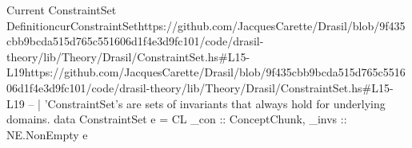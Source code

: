 \begin{haskell}{Current ConstraintSet Definition}{curConstraintSet}{https://github.com/JacquesCarette/Drasil/blob/9f435cbb9bcda515d765c551606d1f4e3d9fc\newline{}101/code/drasil-theory/lib/Theory/Drasil/ConstraintSet.hs\#L15-L19}{https://github.com/JacquesCarette/Drasil/blob/9f435cbb9bcda515d765c551606d1f4e3d9fc101/code/drasil-theory/lib/Theory/Drasil/ConstraintSet.hs\#L15-L19}
-- | 'ConstraintSet's are sets of invariants that always hold for underlying domains.
data ConstraintSet e = CL {
    _con  :: ConceptChunk,
    _invs :: NE.NonEmpty e
}
\end{haskell}
